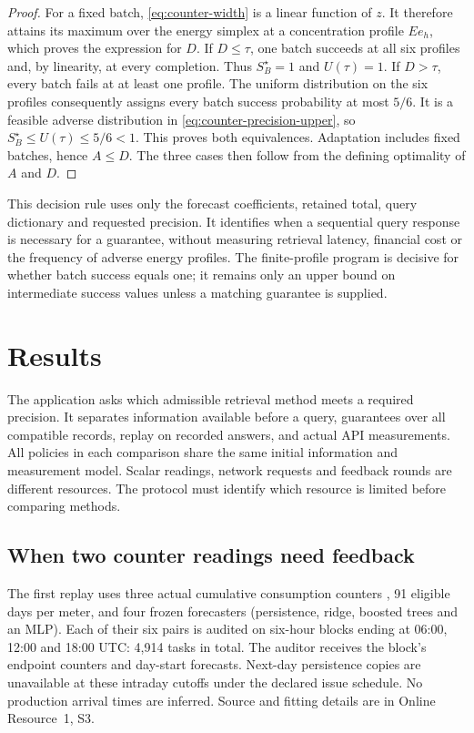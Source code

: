 \documentclass[12pt]{article}
\begin{document}
\begin{proof}
For a fixed batch, \eqref{eq:counter-width} is a linear function of
$z$. It therefore attains its maximum over the energy simplex at a
concentration profile $Ee_h$, which proves the expression for $D$.
If $D\leq\tau$, one batch succeeds at all six profiles and, by
linearity, at every completion. Thus $S_B^\star=1$ and $U(\tau)=1$.
If $D>\tau$, every batch fails at at least one profile. The uniform
distribution on the six profiles consequently assigns every batch
success probability at most $5/6$. It is a feasible adverse distribution
in \eqref{eq:counter-precision-upper}, so
$S_B^\star\leq U(\tau)\leq5/6<1$. This proves both equivalences.
Adaptation includes fixed batches, hence $A\leq D$. The three cases
then follow from the defining optimality of $A$ and $D$.
\end{proof}

This decision rule uses only the forecast coefficients, retained total,
query dictionary and requested precision. It identifies when a sequential
query response is necessary for a guarantee, without measuring retrieval
latency, financial cost or the frequency of adverse energy profiles.
The finite-profile program is decisive for whether batch success equals
one; it remains only an upper bound on intermediate success values unless
a matching guarantee is supplied.
\section{Results}\label{sec:evaluation}
The application asks which admissible retrieval method meets a required
precision. It separates information available before a query, guarantees
over all compatible records, replay on recorded answers, and actual API
measurements. All policies in each comparison share the same initial
information and measurement model. Scalar readings, network requests and
feedback rounds are different resources. The protocol must identify which
resource is limited before comparing methods.
\subsection{When two counter readings need feedback}
\label{sec:counter-precision-results}
The first replay uses three actual cumulative consumption counters \citep{blem}, 91
eligible days per meter, and four frozen forecasters (persistence, ridge,
boosted trees and an MLP). Each of their six pairs is audited on six-hour
blocks ending at 06:00, 12:00 and 18:00 UTC: 4,914 tasks in total.
The auditor receives the block's endpoint counters and day-start forecasts.
Next-day persistence copies are unavailable at these intraday cutoffs under
the declared issue schedule. No production arrival times are inferred.
Source and fitting details are in Online Resource~1, S3.
\end{document}
